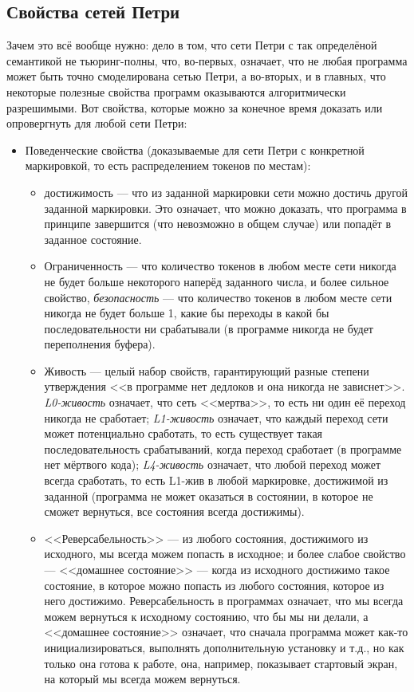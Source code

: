 \documentclass[a5paper]{article}
\begin{document}
\subsection{Свойства сетей Петри}

Зачем это всё вообще нужно: дело в том, что сети Петри с так определёной семантикой не тьюринг-полны, что, во-первых, означает, что не любая программа может быть точно смоделирована сетью Петри, а во-вторых, и в главных, что некоторые полезные свойства программ оказываются алгоритмически разрешимыми. Вот свойства, которые можно за конечное время доказать или опровергнуть для любой сети Петри:

\begin{itemize}
    \item Поведенческие свойства (доказываемые для сети Петри с конкретной маркировкой, то есть распределением токенов по местам):
    \begin{itemize}
        \item достижимость --- что из заданной маркировки сети можно достичь другой заданной маркировки. Это означает, что можно доказать, что программа в принципе завершится (что невозможно в общем случае) или попадёт в заданное состояние.
        \item Ограниченность --- что количество токенов в любом месте сети никогда не будет больше некоторого наперёд заданного числа, и более сильное свойство, \textit{безопасность} --- что количество токенов в любом месте сети никогда не будет больше 1, какие бы переходы в какой бы последовательности ни срабатывали (в программе никогда не будет переполнения буфера).
        \item Живость --- целый набор свойств, гарантирующий разные степени утверждения <<в программе нет дедлоков и она никогда не зависнет>>. \textit{L0-живость} означает, что сеть <<мертва>>, то есть ни один её переход никогда не сработает; \textit{L1-живость} означает, что каждый переход сети может потенциально сработать, то есть существует такая последовательность срабатываний, когда переход сработает (в программе нет мёртвого кода); \textit{L4-живость} означает, что любой переход может всегда сработать, то есть L1-жив в любой маркировке, достижимой из заданной (программа не может оказаться в состоянии, в которое не сможет вернуться, все состояния всегда достижимы).
        \item <<Реверсабельность>> --- из любого состояния, достижимого из исходного, мы всегда можем попасть в исходное; и более слабое свойство --- <<домашнее состояние>> --- когда из исходного достижимо такое состояние, в которое можно попасть из любого состояния, которое из него достижимо. Реверсабельность в программах означает, что мы всегда можем вернуться к исходному состоянию, что бы мы ни делали, а <<домашнее состояние>> означает, что сначала программа может как-то инициализироваться, выполнять дополнительную установку и т.д., но как только она готова к работе, она, например, показывает стартовый экран, на который мы всегда можем вернуться.

\end{itemize}
\end{itemize}
\end{document}
